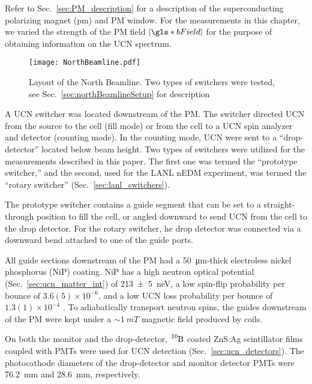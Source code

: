 Refer to Sec.~\ref{sec:PM_description} for a description of the superconducting polarizing magnet (\acrshort*{pm}) and PM window. For the measurements in this chapter, we varied the strength of the PM field $ |\gls*{bField} |$ for the purpose of obtaining information on the UCN spectrum.



\begin{figure}[htp]
    \centering
    \texttt{[image: NorthBeamline.pdf]}
    \caption[Layout of the North Beamline.]{Layout of the North Beamline. Two types of switchers were tested, see Sec.~\ref{sec:northBeamlineSetup} for description}
    \label{fig:NorthBeamlineLayout}
\end{figure}

A UCN switcher was located downstream of the PM. The switcher directed UCN from the source to the cell (fill mode) or from the cell to a UCN spin analyzer and detector (counting mode). In the counting mode, UCN were sent to a ``drop-detector'' located below beam height. Two types of switchers were utilized for the measurements described in this paper. The first one was termed the ``prototype switcher,'' and the second, used for the LANL nEDM experiment, was termed the ``rotary switcher'' (Sec.~\ref{sec:lanl_switchers}).

The prototype switcher contains a guide segment that can be set to a straight-through position to fill the cell, or angled downward to send UCN from the cell to the drop detector. For the rotary switcher, he drop detector was connected via a downward bend attached to one of the guide ports. 

All guide sections downstream of the PM had a \qty{50}{\micro\meter}-thick electroless nickel phosphorus (NiP) coating. NiP has a high neutron optical potential (Sec.~\ref{sec:ucn_matter_int}) of \qty{213(5)}{\nano\eV}, a low spin-flip probability per bounce of $3.6(5) \times 10^{-6}$, and a low UCN loss probability per bounce of $1.3(1) \times 10^{-4}$ \cite{tang_measurement_2016, pattie_jr_evaluation_2017}. To adiabatically transport neutron spins, the guides downstream of the PM were kept under a $\sim\qty{1}{mT}$ magnetic field produced by coils.

On both the monitor and the drop-detector, $\ce{^{10}B}$ coated ZnS:Ag scintillator films coupled with PMTs were used for UCN detection (Sec.~\ref{sec:ucn_detectors}). The photocathode diameters of the drop-detector and monitor detector PMTs were \qty{76.2}{\mm} and \qty{28.6}{\mm}, respectively.

